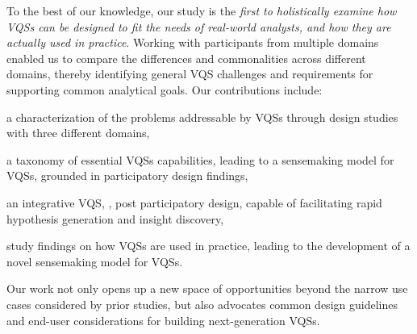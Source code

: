  \par To the best of our knowledge, our study is the \emph{first to holistically examine how VQSs can be designed to fit the needs of real-world analysts, and how they are actually used in practice}. Working with participants from multiple domains enabled us to compare the differences and commonalities across different domains, thereby identifying general VQS challenges and requirements for supporting common analytical goals. Our contributions include:
 \begin{denselist}
 \item a characterization of the problems addressable by VQSs through design studies with three different domains,
 \item a taxonomy of essential VQSs capabilities, leading to a sensemaking model for VQSs, grounded in participatory design findings, %
 \item an integrative VQS, \zvpp, post participatory design, capable of facilitating rapid hypothesis generation and insight discovery,
 \item study findings on how VQSs are used in practice, leading to the development of a novel sensemaking model for VQSs. %
 \end{denselist}
 Our work not only opens up a new space of opportunities beyond the narrow use cases considered by prior studies, but also advocates common design guidelines and end-user considerations for building next-generation VQSs.